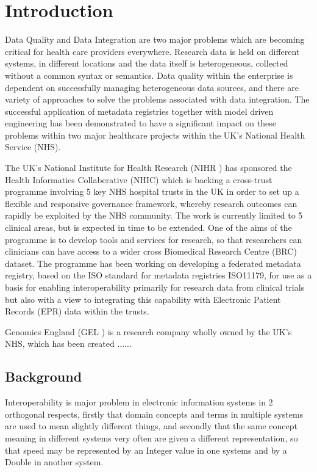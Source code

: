 

\section{Introduction}

Data Quality and Data Integration are two major problems which are becoming critical for health care providers everywhere. Research data is held on different systems, in different locations and the data itself is heterogeneous, collected without a common syntax or semantics. Data quality within the enterprise is dependent on successfully managing heterogeneous data sources, and there are variety of approaches to solve the problems associated with data integration.   The successful application of metadata registries together with model driven engineering has been demonstrated to have a significant impact on these problems within two major healthcare projects within the UK's National Health Service (NHS).

The UK's National Institute for Health Research (NIHR \cite{NIHR}) has sponsored the Health Informatics Collaberative (NHIC) which is backing a cross-trust programme involving 5 key NHS hospital trusts in the UK in order to set up a flexible and responsive governance framework, whereby research outcomes can rapidly be exploited by the NHS community. The work is currently limited to 5 clinical areas, but is expected in time to be extended. One of the aims of the programme is to develop tools and services for research, so that researchers can clinicians can have access to a wider cross Biomedical Research Centre (BRC) dataset. The programme has been working on developing a federated metadata registry, based on the ISO standard for metadata registries ISO11179\cite{ISO11179}, for use as a basis for enabling interoperability primarily for research data from clinical trials but also with a view to integrating this capability with Electronic Patient Records (EPR) data within the trusts.

Genomics England (GEL \cite{GEL}) is a research company wholly owned by the UK's NHS, which has been created ......

\subsection{Background}

Interoperability is major problem in electronic information systems in 2 orthogonal respects, firstly that domain concepts and terms in multiple systems are used to mean slightly different things, and secondly that the same concept meaning in different systems very often are given a different representation, so that speed may be represented by an Integer value in one systems and by a Double in another system.

